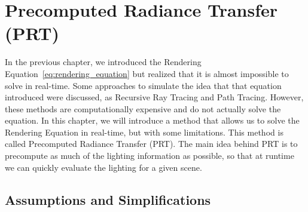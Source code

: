 \chapter{Precomputed Radiance Transfer (PRT)}

In the previous chapter, we introduced the Rendering Equation~\eqref{eq:rendering_equation} but realized that it is almost impossible to solve in real-time. Some approaches to simulate the idea that that equation introduced were discussed, as Recursive Ray Tracing and Path Tracing. However, these methods are computationally expensive and do not actually solve the equation. In this chapter, we will introduce a method that allows us to solve the Rendering Equation in real-time, but with some limitations. This method is called Precomputed Radiance Transfer (PRT). The main idea behind PRT is to precompute as much of the lighting information as possible, so that at runtime we can quickly evaluate the lighting for a given scene.

\section{Assumptions and Simplifications}

